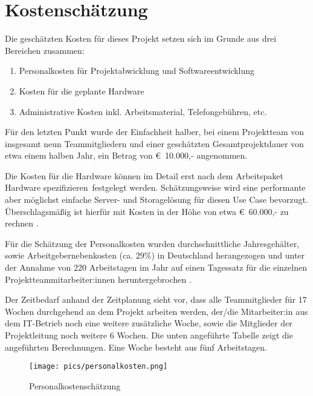 \section{Kostenschätzung}

Die geschätzten Kosten für dieses Projekt setzen sich im Grunde aus drei Bereichen zusammen:

\begin{enumerate}
	\itemsep-8pt
	\item Personalkosten für Projektabwicklung und Softwareentwicklung
  	\item Kosten für die geplante Hardware
 	\item Administrative Kosten inkl. Arbeitsmaterial, Telefongebühren, etc. 
\end{enumerate}

Für den letzten Punkt wurde der Einfachheit halber, bei einem Projektteam von insgesamt neun Teammitgliedern und einer geschätzten Gesamtprojektdauer von etwa einem halben Jahr, ein Betrag von €~10.000,- angenommen.

Die Kosten für die Hardware können im Detail erst nach dem Arbeitspaket \glqq Hardware spezifizieren\grqq\ festgelegt werden. Schätzungsweise wird eine performante aber möglichst einfache Server- und Storagelösung für diesen Use Case bevorzugt. Überschlagsmäßig ist hierfür mit Kosten in der Höhe von etwa €~60.000,- zu rechnen \citep{thomas-krennag_rack-server_2025}.

Für die Schätzung der Personalkosten wurden durchschnittliche Jahresgehälter, sowie Arbeitgebernebenkosten (ca. 29\%) in Deutschland herangezogen und unter der Annahme von 220 Arbeitstagen im Jahr auf einen Tagessatz für die einzelnen Projektteammitarbeiter:innen heruntergebrochen \citep{chatgpt_schatzung_2025}.

Der Zeitbedarf anhand der Zeitplanung sieht vor, dass alle Teammitglieder für 17 Wochen durchgehend an dem Projekt arbeiten werden, der/die Mitarbeiter:in aus dem IT-Betrieb noch eine weitere zusätzliche Woche, sowie die Mitglieder der Projektleitung noch weitere 6 Wochen. Die unten angeführte Tabelle zeigt die angeführten Berechnungen. Eine Woche besteht aus fünf Arbeitstagen. 

\begin{figure}[h]
\centering
\texttt{[image: pics/personalkosten.png]}
\caption{Personalkostenschätzung} 
\label{fig:costs}
\end{figure}

\FloatBarrier

